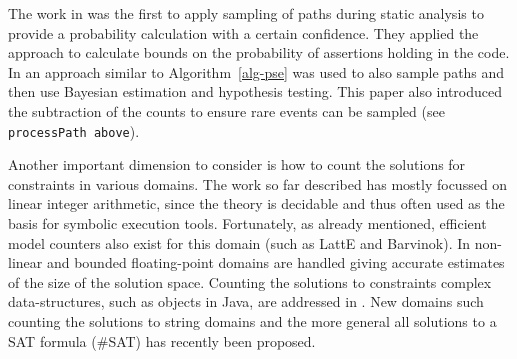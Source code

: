 The work in \cite{Sankaranarayanan2013} was the first to apply sampling of paths during static analysis to provide a probability calculation with a certain confidence. They applied the approach to calculate bounds on the probability of assertions holding in the code. In \cite{Filieri2014} an approach similar to Algorithm~\ref{alg-pse} was used to also sample paths and then use Bayesian estimation and hypothesis testing. This paper also introduced the subtraction of the counts to ensure rare events can be sampled (see {\tt processPath above}). 


Another important dimension to consider is how to count the solutions for constraints in various domains. The work so far described has mostly focussed on linear integer arithmetic, since the theory is decidable and thus often used as the basis for symbolic execution tools. Fortunately, as already mentioned, efficient model counters also exist for this domain (such as LattE\cite{deloera2012software} and Barvinok\cite{verdoolaegesoftware}). In \cite{Borges2014} non-linear and bounded floating-point domains are handled giving accurate estimates of the size of the solution space. Counting the solutions to constraints complex data-structures, such as objects in Java, are addressed in \cite{Filieri2015}. New domains such counting the solutions to string domains \cite{Aydin2015} and the more general all solutions to a SAT formula (\#SAT) \cite{Chakraborty2014} has recently been proposed. 

